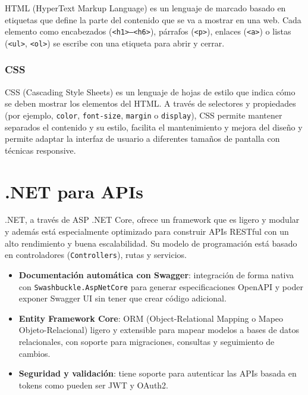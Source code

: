 HTML (HyperText Markup Language) es un lenguaje de marcado basado en etiquetas que define la parte del contenido que se va a mostrar en una web. Cada elemento como encabezados (\texttt{<h1>–<h6>}), párrafos (\texttt{<p>}), enlaces (\texttt{<a>}) o listas (\texttt{<ul>}, \texttt{<ol>}) se escribe con una etiqueta para abrir y cerrar.


\subsubsection{CSS}

CSS (Cascading Style Sheets) es un lenguaje de hojas de estilo que indica cómo se deben mostrar los elementos del HTML. A través de selectores y propiedades (por ejemplo, \texttt{color}, \texttt{font-size}, \texttt{margin} o \texttt{display}), CSS permite mantener separados el contenido y su estilo, facilita el mantenimiento y mejora del diseño y permite adaptar la interfaz de usuario a diferentes tamaños de pantalla con técnicas responsive.


\section{.NET para APIs}\label{net}

.NET, a través de ASP .NET Core, ofrece un framework que es ligero y modular y además está especialmente optimizado para construir APIs RESTful con un alto rendimiento y buena escalabilidad. Su modelo de programación está basado en controladores (\texttt{Controllers}), rutas y servicios.

\begin{itemize} 
  \item \textbf{Documentación automática con Swagger}: integración de forma nativa con \texttt{Swashbuckle.AspNetCore} para generar especificaciones OpenAPI y poder exponer Swagger UI sin tener que crear código adicional.  
  \item \textbf{Entity Framework Core}: ORM (Object-Relational Mapping o Mapeo Objeto-Relacional) ligero y extensible para mapear modelos a bases de datos relacionales, con soporte para migraciones, consultas y seguimiento de cambios.  
  \item \textbf{Seguridad y validación}: tiene soporte para autenticar las APIs basada en tokens como pueden ser JWT y OAuth2.  
\end{itemize}

